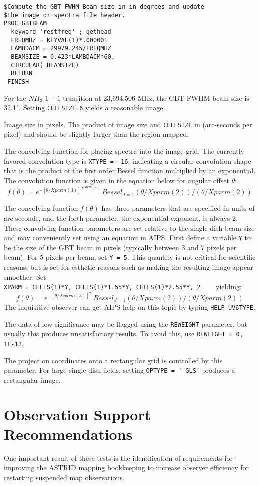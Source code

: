 \documentclass[12pt,twoside]{article}
\newcommand{\myitem}[1]{\item{\makebox[1.25in][l]{{\tt #1}}}}
\begin{document}
\begin{description}
\begin{verbatim}
$Compute the GBT FWHM Beam size in in degrees and update
$the image or spectra file header.
PROC GBTBEAM
  keyword 'restfreq' ; gethead
  FREQMHZ = KEYVAL(1)*.000001
  LAMBDACM = 29979.245/FREQMHZ
  BEAMSIZE = 0.423*LAMBDACM*60.
  CIRCULAR( BEAMSIZE)
  RETURN
 FINISH
\end{verbatim}
For the $NH_3$ $1-1$ transition at 23,694.506 MHz, the GBT FWHM beam size is
32.1".   Setting {\tt CELLSIZE=6} yields a reasonable image.
\myitem{IMSIZE} Image size in pixels.  The product of image size and {\tt CELLSIZE} in 
(arc-seconds per pixel) and should be slightly larger than the region mapped.
\myitem{XTYPE} The convolving function for placing spectra into the image grid.
The currently favored convolution type is {\tt XTYPE = -16}, indicating a circular
convolution shape that is the product of the first order Bessel function multiplied by an exponential.   The convolution function is given in the equation below for angular 
offset $\theta$:
$$
f(\theta) = e^{- [\theta/Xparm(3)]^{Xparm(4)}} ~ Bessel_{J=1}( \theta/Xparm(2)) / (\theta/Xparm(2))
$$ 
\myitem{XPARM}  The convolving function $f(\theta)$ has three parameters that are specified
in units of arc-seconds, and the forth parameter, the exponential exponent, is
always 2.   These convolving function parameters are set relative to the single dish
beam size and may conveniently set using an equation in AIPS.   First define
a variable {\tt Y} to be the size of the GBT beam in pixels (typically between 3 and
7 pixels per beam).    For 5 pixels per beam, set {\tt Y = 5}.   This quantity is
not critical for scientific reasons, but is set for esthetic  reasons such as making
the resulting image appear smoother.   Set \\
{\tt XPARM =  CELLS(1)*Y, CELLS(1)*1.55*Y, CELLS(1)*2.55*Y, 2} ~~~
yielding:
$$
f(\theta) = e^{- [\theta/Xparm(3)]^2} ~ Bessel_{J=1}( \theta/Xparm(2)) / (\theta/Xparm(2))
$$ 
The inquisitive observer can get AIPS help on this topic by typing {\tt HELP UV6TYPE}.
\myitem{REWEIGHT} The data of low significance may be flagged using the
{\tt REWEIGHT} parameter, but usually this produces unsatisfactory results.  To
avoid this, use {\tt REWEIGHT = 0, 1E-12}.
\myitem{OPTYPE} The project on coordinates onto a rectangular grid is controlled by
this parameter.  For large single dish fields,  setting {\tt OPTYPE = '-GLS'} produces
a rectangular image.
\end{description}

\section{Observation Support Recommendations}
One important result of these tests is the identification of requirements for
improving the ASTRID
mapping bookkeeping to increase observer efficiency for restarting 
suspended map observations.  
\end{document}
